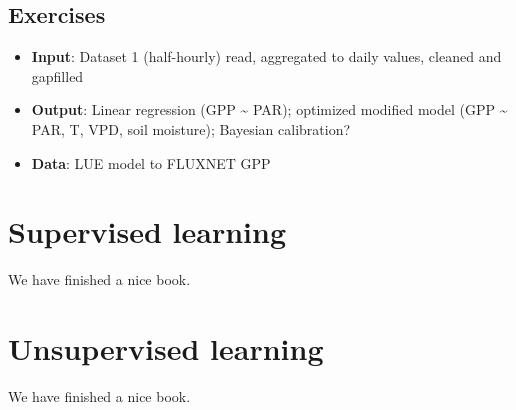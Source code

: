 \documentclass[]{book}
\providecommand{\tightlist}{%
  \setlength{\itemsep}{0pt}\setlength{\parskip}{0pt}}
\begin{document}
\hypertarget{exercises-3}{%
\section{Exercises}\label{exercises-3}}

\begin{itemize}
\tightlist
\item
  \textbf{Input}: Dataset 1 (half-hourly) read, aggregated to daily values, cleaned and gapfilled
\item
  \textbf{Output}: Linear regression (GPP \textasciitilde{} PAR); optimized modified model (GPP \textasciitilde{} PAR, T, VPD, soil moisture); Bayesian calibration?
\item
  \textbf{Data}: LUE model to FLUXNET GPP
\end{itemize}

\hypertarget{supervised-learning}{%
\chapter{Supervised learning}\label{supervised-learning}}

We have finished a nice book.

\hypertarget{unsupervised-learning}{%
\chapter{Unsupervised learning}\label{unsupervised-learning}}

We have finished a nice book.


\end{document}
